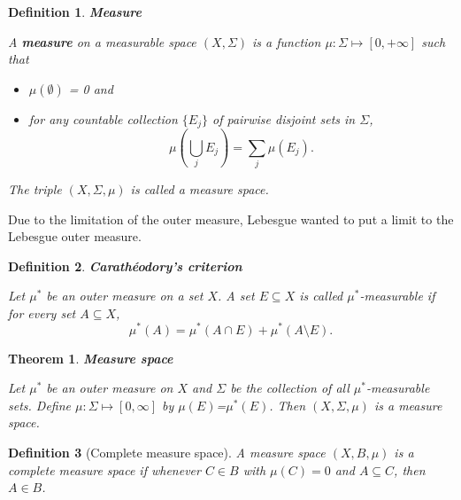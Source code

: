 \documentclass[12pt]{amsart}
\newtheorem{definition}{Definition}
\theoremstyle{plain}
\newtheorem{thm}{Theorem}[section]
\theoremstyle{definition}
\theoremstyle{remark}
\numberwithin{equation}{section}
\numberwithin{thm}{section}
\begin{document}

\begin{definition}
\textbf{Measure}

A \textbf{measure} on a measurable space $(X,\Sigma)$ is a function $\mu: \Sigma \mapsto [0,+\infty]$ such that
    \begin{itemize}
        \item [(i)] $\mu(\emptyset)$ = 0 and         
        \item [(ii)] for any countable collection $\{E_j \}$ of pairwise disjoint sets in $\Sigma$,
        \begin{equation*}
            \mu(\bigcup_j E_j ) = \sum_j \mu(E_j).            
        \end{equation*}
    \end{itemize}
    The triple $(X,\Sigma,\mu)$ is called a measure space.
\end{definition}
Due to the limitation of the outer measure, Lebesgue wanted to put a limit to the Lebesgue outer measure.



\begin{definition}
\textbf{Carathéodory's criterion}

Let $\mu^*$ be an outer measure on a set $X$. A set $E \subseteq X$ is called $\mu^*$-measurable if for every set $A \subseteq X$, 
\begin{equation*}
    \mu^*(A) = \mu^*(A \cap E) + \mu^*(A\setminus E).
\end{equation*}
\end{definition}

\begin{thm}
\textbf{Measure space}

    Let $\mu^*$ be an outer measure on $X$ and $\Sigma$ be the collection of all $\mu^*$-measurable sets. Define $\mu : \Sigma \mapsto [0,\infty]$ by $\mu(E)$=$\mu^*(E)$. Then $(X,\Sigma,\mu)$ is a measure space.
\end{thm}

\begin{definition}[Complete measure space]
   A measure space $(X,B,\mu)$ is a complete measure space if whenever $C \in B$ with $\mu(C) =0$ and $A \subseteq C$, then $A \in B$.
\end{definition}
\end{document}
